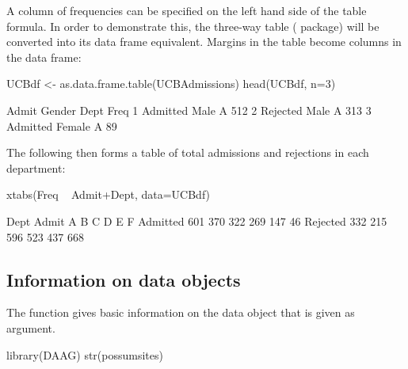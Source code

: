 A column of frequencies can be specified on the left hand side of the
table formula. In order to demonstrate this, the three-way table
 ( package) will be converted into
its data frame equivalent.  Margins in the table become columns in
the data frame:
\begin{Schunk}
\begin{Sinput}
UCBdf <- as.data.frame.table(UCBAdmissions)
head(UCBdf, n=3)
\end{Sinput}
\begin{Soutput}
     Admit Gender Dept Freq
1 Admitted   Male    A  512
2 Rejected   Male    A  313
3 Admitted Female    A   89
\end{Soutput}
\end{Schunk}

The following then forms a table of total admissions and rejections
in each department:
\begin{Schunk}
\begin{Sinput}
xtabs(Freq ~  Admit+Dept, data=UCBdf)
\end{Sinput}
\begin{Soutput}
          Dept
Admit        A   B   C   D   E   F
  Admitted 601 370 322 269 147  46
  Rejected 332 215 596 523 437 668
\end{Soutput}
\end{Schunk}


\subsection*{Information on data objects}

The function  gives basic information on the data object that
is given as argument.
\begin{Schunk}
\begin{Sinput}
library(DAAG)
str(possumsites)
\end{Sinput}
\end{Schunk}

